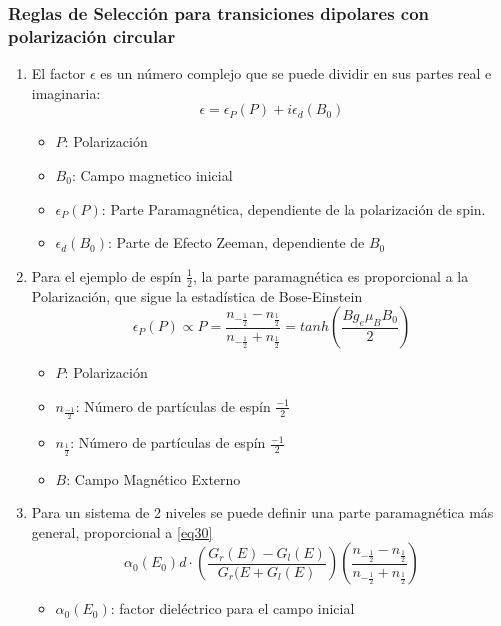 \documentclass[aps,rmp,reprint,longbibliography]{revtex4-1}
\begin{document}
\subsubsection{Reglas de Selección para transiciones dipolares con polarización circular}
\begin{enumerate}
\item El factor $\epsilon$ es un número complejo que se puede dividir en sus partes real e imaginaria:
\begin{equation}\label{eq28} \epsilon=\epsilon_P(P)+i\epsilon_d(B_0)\end{equation}
\begin{itemize}
    \item $P$: Polarización
    \item $B_0$: Campo magnetico inicial
    \item $\epsilon_P(P)$: Parte Paramagnética, dependiente de la polarización de spin.
    \item $\epsilon_d(B_0)$: Parte de Efecto Zeeman, dependiente de $B_0$
\end{itemize}
\item Para el ejemplo de espín $\frac{1}{2}$, la parte paramagnética es proporcional a la Polarización, que sigue la estadística de Bose-Einstein
\begin{equation}\label{eq29}\epsilon_P(P)\propto P=\frac{n_{-\frac{1}{2}}-n_{\frac{1}{2}}}{n_{-\frac{1}{2}}+n_{\frac{1}{2}}}=tanh(\frac{Bg_e\mu_BB_0}{2})\end{equation}
\begin{itemize}
    \item $P$: Polarización
    \item $n_{\frac{-1}{2}}$: Número de partículas de espín $\frac{-1}{2}$
    \item $n_{\frac{1}{2}}$: Número de partículas de espín $\frac{-1}{2}$
    \item $B$: Campo Magnético Externo
\end{itemize}
\item Para un sistema de 2 niveles se puede definir  una parte paramagnética más general, proporcional a \ref{eq30}
\begin{equation}\label{eq30} \alpha_0(E_0)d\cdot(\frac{G_r(E)-G_l(E)}{G_r(E+G_l(E)})(\frac{n_{-\frac{1}{2}}-n_{\frac{1}{2}}}{n_{-\frac{1}{2}}+n_{\frac{1}{2}}})\end{equation}
\begin{itemize}
    \item $\alpha_0(E_0)$: factor dieléctrico para el campo inicial

\end{itemize}
\end{enumerate}
\end{document}

